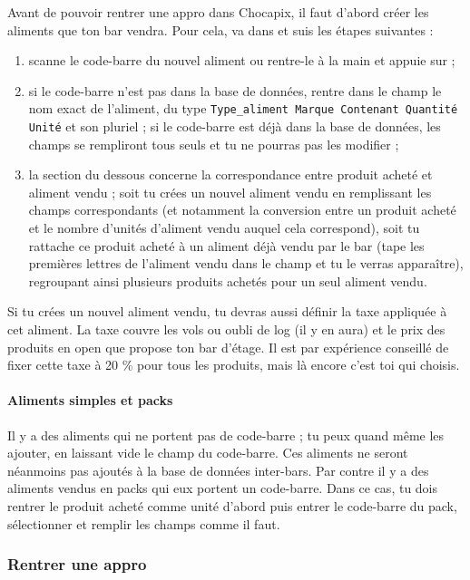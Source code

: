 \documentclass[12pt,french]{article}
\begin{document}
Avant de pouvoir rentrer une appro dans Chocapix, il faut d'abord créer les aliments que ton bar vendra. Pour cela, va dans  et suis les étapes suivantes :
\begin{enumerate}
	\item scanne le code-barre du nouvel aliment ou rentre-le à la main et appuie sur  ;
	\item si le code-barre n'est pas dans la base de données, rentre dans le champ  le nom exact de l'aliment, du type \texttt{Type\_aliment Marque Contenant Quantité Unité} et son pluriel ; si le code-barre est déjà dans la base de données, les champs se rempliront tous seuls et tu ne pourras pas les modifier ;
	\item la section du dessous concerne la correspondance entre produit acheté et aliment vendu ; soit tu crées un nouvel aliment vendu en remplissant les champs correspondants (et notamment la conversion entre un produit acheté et le nombre d'unités d'aliment vendu auquel cela correspond), soit tu rattache ce produit acheté à un aliment déjà vendu par le bar (tape les premières lettres de l'aliment vendu dans le champ  et tu le verras apparaître), regroupant ainsi plusieurs produits achetés pour un seul aliment vendu.
\end{enumerate}
Si tu crées un nouvel aliment vendu, tu devras aussi définir la taxe appliquée à cet aliment. La taxe couvre les vols ou oubli de log (il y en aura) et le prix des produits en open que propose ton bar d'étage. Il est par expérience conseillé de fixer cette taxe à 20 \% pour tous les produits, mais là encore c'est toi qui choisis.

\paragraph{Aliments simples et packs} Il y a des aliments qui ne portent pas de code-barre ; tu peux quand même les ajouter, en laissant vide le champ du code-barre. Ces aliments ne seront néanmoins pas ajoutés à la base de données inter-bars. Par contre il y a des aliments vendus en packs qui eux portent un code-barre. Dans ce cas, tu dois rentrer le produit acheté comme unité d'abord puis entrer le code-barre du pack, sélectionner  et remplir les champs comme il faut.

\subsubsection{Rentrer une appro}
\end{document}
